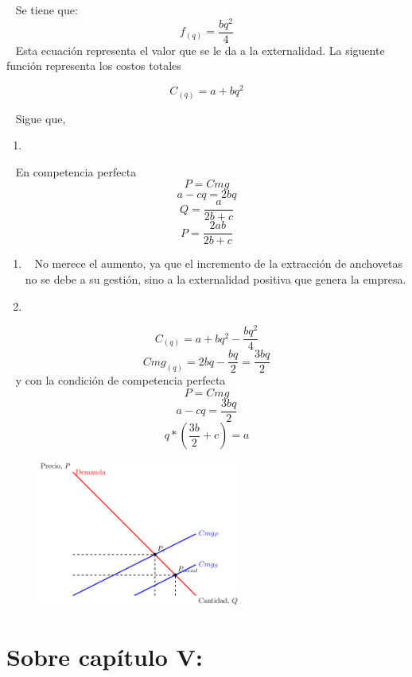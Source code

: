 \documentclass[
  letterpaper,
  DIV=11,
  numbers=noendperiod]{scrreport}
\providecommand{\tightlist}{%
  \setlength{\itemsep}{0pt}\setlength{\parskip}{0pt}}\usepackage{longtable,booktabs,array}
\begin{document}
~ Se tiene que: \[f_{(q)}=\frac{bq^{2}}{4}\] ~ Esta ecuación representa
el valor que se le da a la externalidad. La siguente función representa
los costos totales

\[C_{(q)}= a + bq^{2}\]

~ Sigue que,

\begin{enumerate}
\def\labelenumi{\alph{enumi})}
\tightlist
\item
\end{enumerate}

~ En competencia perfecta \[P = Cmg\] \[a - cq = 2bq\]
\[Q=\frac{a}{2b+c}\] \[P=\frac{2ab}{2b+c}\]

\begin{enumerate}
\def\labelenumi{\alph{enumi})}
\setcounter{enumi}{1}
\item
  ~ No merece el aumento, ya que el incremento de la extracción de
  anchovetas no se debe a su gestión, sino a la externalidad positiva
  que genera la empresa.
\item
\end{enumerate}

\[C_{(q)}= a + bq^{2}-\frac{bq^{2}}{4}\]
\[Cmg_{(q)}= 2bq-\frac{{bq}}{2}= \frac{{3bq}}{2}\] ~ y con la condición
de competencia perfecta \[P = Cmg\] \[a - cq = \frac{{3bq}}{2}\]
\[{q*(\frac{{3b}}{2} + c)} = a \]

\begin{figure}

{\centering \includegraphics[width=0.6\textwidth,height=\textheight]{7,8titulo_files/figure-pdf/unnamed-chunk-14-1.pdf}

}

\end{figure}

\hypertarget{sobre-capuxedtulo-v}{%
\section{Sobre capítulo V:}\label{sobre-capuxedtulo-v}}
\end{document}
